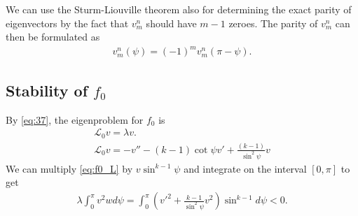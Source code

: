 We can use the Sturm-Liouville theorem also for determining the exact
parity of eigenvectors by the fact that $v_m^n$ should have $m-1$
zeroes. The parity of $v_m^n$ can then be formulated as
\begin{align}
  \label{eq:50}
  v_m^n(\psi)=(-1)^m v_m^n(\pi-\psi).
\end{align}

\subsection{Stability of $f_0$}
\label{sec:stability-f_0}

By \eqref{eq:37}, the eigenproblem for $f_0$ is
\begin{align}
  \label{eq:f0_L}
  \mathcal{L}_0 v = \lambda v. \\
  \label{eq:37}
  \mathcal{L}_0 v = -v''-(k-1)\cot\psi v'+\frac{(k-1)}{\sin^2\psi}v
\end{align}
We can multiply \eqref{eq:f0_L} by $v\sin^{k-1}\psi$ and integrate on
the interval $[0,\pi]$ to get
\begin{align}\label{eq:47}
  \lambda\int_0^\pi v^2w
  d\psi=\int_0^\pi\left(v'^2+\frac{k-1}{\sin^2\psi}v^2\right)\sin^{k-1}d\psi<0.
\end{align}

